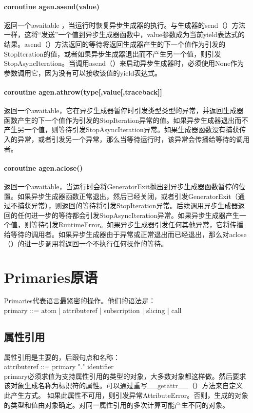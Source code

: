 \documentclass[10pt,UTF8]{ctexart}
\begin{document}
\paragraph{coroutine agen.asend(value)}返回一个awaitable ，当运行时恢复异步生成器的执行。与生成器的send（）方法一样，这将“发送”一个值到异步生成器函数中，value参数成为当前yield表达式的结果。asend（）方法返回的等待将返回生成器产生的下一个值作为引发的StopIteration的值，或者如果异步生成器退出而不产生另一个值，则引发StopAsyncIteration。当调用asend（）来启动异步生成器时，必须使用None作为参数调用它，因为没有可以接收该值的yield表达式。
\paragraph{coroutine agen.athrow(type[,value[,traceback]]}
返回一个awaitable，它在异步生成器暂停时引发类型类型的异常，并返回生成器函数产生的下一个值作为引发的StopIteration异常的值。如果异步生成器退出而不产生另一个值，则等待引发StopAsyncIteration异常。如果生成器函数没有捕获传入的异常，或者引发另一个异常，那么当等待运行时，该异常会传播给等待的调用者。
\paragraph{coroutine agen.aclose()}
返回一个awaitable，当运行时会将GeneratorExit抛出到异步生成器函数暂停的位置。如果异步生成器函数正常退出，然后已经关闭，或者引发GeneratorExit（通过不捕获异常），则返回的等待将引发StopIteration异常。后续调用异步生成器返回的任何进一步的等待都会引发StopAsyncIteration异常。如果异步生成器产生一个值，则等待引发RuntimeError。如果异步生成器引发任何其他异常，它将传播给等待的调用者。如果异步生成器由于异常或正常退出而已经退出，那么对aclose（）的进一步调用将返回一个不执行任何操作的等待。
\section{Primaries原语}
Primaries代表语言最紧密的操作。他们的语法是：\\
primary ::= atom | attributeref | subscription | slicing | call
\subsection{属性引用}
属性引用是主要的，后跟句点和名称：\\
attributeref ::=  primary "." identifier\\
\indent primary必须求值为支持属性引用的类型的对象，大多数对象都这样做。然后要求该对象生成名称为标识符的属性。可以通过重写__getattr__（）方法来自定义此产生方式。
如果此属性不可用，则引发异常AttributeError。否则，生成的对象的类型和值由对象确定。对同一属性引用的多次计算可能产生不同的对象。
\end{document}
